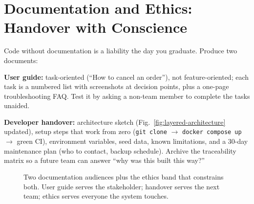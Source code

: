 \section{Documentation and Ethics: Handover with Conscience}
\label{sec:documentation-ethics}

Code without documentation is a liability the day you graduate. Produce two documents:

\textbf{User guide:} task-oriented (``How to cancel an order''), not feature-oriented; each task is a numbered list with screenshots at decision points, plus a one-page troubleshooting FAQ. Test it by asking a non-team member to complete the tasks unaided.

\textbf{Developer handover:} architecture sketch (Fig.~\ref{fig:layered-architecture} updated), setup steps that work from zero (\texttt{git clone} $\to$ \texttt{docker compose up} $\to$ green CI), environment variables, seed data, known limitations, and a 30-day maintenance plan (who to contact, backup schedule). Archive the traceability matrix so a future team can answer ``why was this built this way?''

\begin{figure}[h]
\centering
{}
\caption{Two documentation audiences plus the ethics band that constrains both. User guide serves the stakeholder; handover serves the next team; ethics serves everyone the system touches.}
\label{fig:docs-ethics}
\end{figure}

